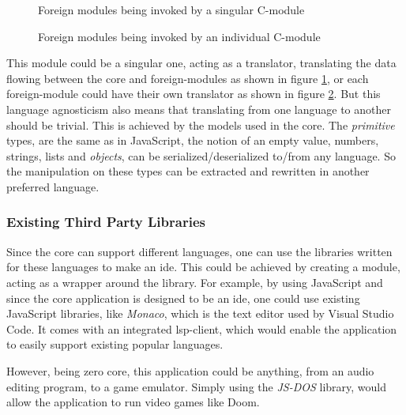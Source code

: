 \begin{figure}
  \begin{center}
    
    \caption{Foreign modules being invoked by a singular C-module}
    \label{fig:fm1}
  \end{center}
\end{figure}

\begin{figure}
  \begin{center}
    
    \caption{Foreign modules being invoked by an individual C-module}
    \label{fig:fm2}
  \end{center}
\end{figure}

This module could be a singular one, acting as a translator, translating the
data flowing between the core and foreign-modules as shown in figure
\ref{fig:fm1}, or each foreign-module could have their own translator as shown
in figure \ref{fig:fm2}. But this language agnosticism also means that
translating from one language to another should be trivial. This is achieved by
the models used in the core. The \textit{primitive} types, are the same as in
JavaScript, the notion of an empty value, numbers, strings, lists and
\textit{objects}, can be serialized/deserialized to/from any language. So the
manipulation on these types can be extracted and rewritten in another preferred
language.

\subsubsection{Existing Third Party Libraries}

Since the core can support different languages, one can use the libraries
written for these languages to make an \gls{ide}. This could be achieved by
creating a module, acting as a wrapper around the library. For example, by
using JavaScript and since the core application is designed to be an \gls{ide},
one could use existing JavaScript libraries, like \textit{Monaco}, which is the
text editor used by Visual Studio Code. It comes with an integrated
\gls{lsp}-client, which would enable the application to easily support existing
popular languages.

However, being zero core, this application could be anything, from an audio
editing program, to a game emulator. Simply using the \textit{JS-DOS} library,
would allow the application to run video games like Doom.

